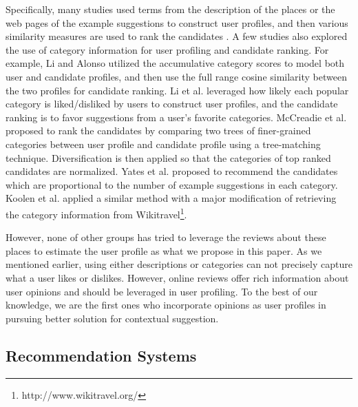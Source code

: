 Specifically, many studies used terms from the description of the places or 
the web pages of the example suggestions to construct user profiles, 
and then various similarity measures are used to rank the candidates
\cite{udel:treccs2012,irit:treccs2012,up:treccs2013}. 
A few studies also explored the use of category information for user profiling 
and candidate ranking. For example, 
Li and Alonso \cite{rama:treccs2014} utilized the accumulative category 
scores to model both user and candidate profiles, and then use 
the full range cosine similarity between the two profiles for candidate ranking. 
Li et al. \cite{bjut:treccs2014} leveraged how likely each popular category is 
liked/disliked by users to construct user profiles, and the candidate ranking is 
to favor suggestions from a user's favorite categories. 
McCreadie et al. \cite{glasgow:treccs2014} proposed to rank the 
candidates by comparing two trees of finer-grained categories between 
user profile and candidate profile using a tree-matching technique. 
Diversification is then applied so that the categories of top ranked 
candidates are normalized.
Yates et al. \cite{georgetown:treccs2012} proposed to 
recommend the candidates which are proportional to the number of 
example suggestions in each category.
Koolen et al. \cite{uamst:treccs2013} applied a similar method 
with a major modification of 
retrieving the category information from Wikitravel\footnote{http://www.wikitravel.org/}.

However, none of other groups has tried to leverage the reviews
about these places to estimate the user profile as what we 
propose in this paper. As we mentioned earlier, using either 
descriptions or categories can not precisely capture what a 
user likes or dislikes. However, online reviews offer rich 
information about user opinions and should be leveraged 
in user profiling. To the best of our knowledge, we are the first ones who incorporate 
opinions as user profiles in pursuing better solution for contextual suggestion.

\subsection{Recommendation Systems} 

